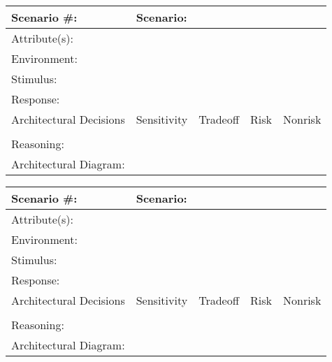 \begin{tabular}{|m{}|m{}|m{}|m{}|m{}|m{}|}
  \hline
  Scenario \#: & \multicolumn{5}{m{0.75 \textwidth}|}{Scenario:} \\ \hline
  \multicolumn{6}{|m{0.9 \textwidth}|}{Attribute(s):} \\ \hline
  \multicolumn{6}{|m{0.9 \textwidth}|}{Environment:} \\ \hline
  \multicolumn{6}{|m{0.9 \textwidth}|}{Stimulus:} \\ \hline
  \multicolumn{6}{|m{0.9 \textwidth}|}{Response:} \\ \hline
  \multicolumn{2}{|m{0.3 \textwidth}|}{Architectural Decisions} & Sensitivity & Tradeoff & Risk & Nonrisk \\ \hline
  \multicolumn{2}{|m{0.3 \textwidth}|}{} &  &  &  &  \\ \hline
  \multicolumn{6}{|m{0.9 \textwidth}|}{Reasoning:} \\ \hline
  \multicolumn{6}{|m{0.9 \textwidth}|}{Architectural Diagram: } \\ \hline
\end{tabular}

\begin{tabular}{|m{}|m{}|m{}|m{}|m{}|m{}|}
  \hline
  Scenario \#: & \multicolumn{5}{m{0.75 \textwidth}|}{Scenario:} \\ \hline
  \multicolumn{6}{|m{0.9 \textwidth}|}{Attribute(s):} \\ \hline
  \multicolumn{6}{|m{0.9 \textwidth}|}{Environment:} \\ \hline
  \multicolumn{6}{|m{0.9 \textwidth}|}{Stimulus:} \\ \hline
  \multicolumn{6}{|m{0.9 \textwidth}|}{Response:} \\ \hline
  \multicolumn{2}{|m{0.3 \textwidth}|}{Architectural Decisions} & Sensitivity & Tradeoff & Risk & Nonrisk \\ \hline
  \multicolumn{2}{|m{0.3 \textwidth}|}{} &  &  &  &  \\ \hline
  \multicolumn{6}{|m{0.9 \textwidth}|}{Reasoning:} \\ \hline
  \multicolumn{6}{|m{0.9 \textwidth}|}{Architectural Diagram: } \\ \hline
\end{tabular}

